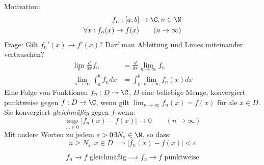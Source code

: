 \documentclass[a4paper,10pt]{scrbook}
\begin{document}
Motivation:\
\begin{align*}
 f_n:[a,b]\to \C, n\in \N\\
\forall x: f_n(x)\to f(x) \qquad (n\to\infty)\\
\end{align*}
Frage: Gilt $f_n'(x)\to f'(x)$? Darf man Ableitung und Limes miteinander vertauschen?
\begin{align*}
	\lim_n\frac d{dx}f_n&=\frac d{dx}\lim_{n\to\infty}f_n\\
\lim_{n\to\infty}\int_a^bf_ndx&=\int_b^b\lim_{n\to\infty}f_n(x)dx
\end{align*}
Eine Folge von Funktionen $f_n:D\to\C$, $D$ eine beliebige Menge, konvergiert punktweise gegen $f:D\to\C$, wenn gilt $\lim_{n\to\infty}f_n(x)=f(x)$ für ale $x\in D$.
Sie konvergiert \emph{gleichmäßig} gegen $f$ wenn:
\[
\sup_{…\in 0}|f_n(x)-f(x)|\to 0\qquad (n\to\infty)
\]
Mit andere Worten zu jedem $\varepsilon>0 \exists N_\varepsilon \in \N$, so dass:
\[
n\ge N_\varepsilon, x\in D \implies |f_n(x)-f(x)|<\varepsilon
\]
\begin{note}
\[
f_n\to f \text{ gleichmäßig} \implies f_n\to f \text{ punktweise}
\]
\end{note}
\end{document}
